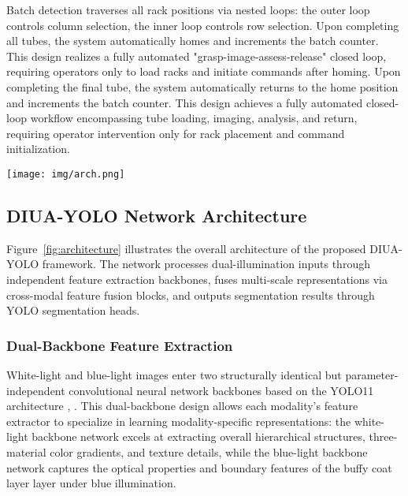 Batch detection traverses all rack positions via nested loops: the outer loop controls column selection, the inner loop controls row selection. Upon completing all tubes, the system automatically homes and increments the batch counter. This design realizes a fully automated "grasp-image-assess-release" closed loop, requiring operators only to load racks and initiate commands after homing. Upon completing the final tube, the system automatically returns to the home position and increments the batch counter. This design achieves a fully automated closed-loop workflow encompassing tube loading, imaging, analysis, and return, requiring operator intervention only for rack placement and command initialization.

\begin{figure*}[!t]
\centering
\texttt{[image: img/arch.png]}
\caption{\textbf{The proposed DIUA-YOLO framework,} comprising dual-illumination input, dual-backbone feature extraction, cross-spectral feature fusion, and YOLO11 segmentation modules. 
White-light and blue-light images are independently processed through modality-specific backbones to capture complementary structural and contrast information. 
Fused multi-scale representations are decoded through neck and segmentation heads to accurately localize plasma, buffy coat, and erythrocyte layers.}
\label{fig:architecture}
\end{figure*}

\subsection{DIUA-YOLO Network Architecture}

Figure~\ref{fig:architecture} illustrates the overall architecture of the proposed DIUA-YOLO framework. The network processes dual-illumination inputs through independent feature extraction backbones, fuses multi-scale representations via cross-modal feature fusion blocks, and outputs segmentation results through YOLO segmentation heads.

\subsubsection{Dual-Backbone Feature Extraction} White-light and blue-light images enter two structurally identical but parameter-independent convolutional neural network backbones based on the YOLO11 architecture \cite{yolo11}, \cite{yolo12}. This dual-backbone design allows each modality's feature extractor to specialize in learning modality-specific representations: the white-light backbone network excels at extracting overall hierarchical structures, three-material color gradients, and texture details, while the blue-light backbone network captures the optical properties and boundary features of the buffy coat layer layer under blue illumination.

